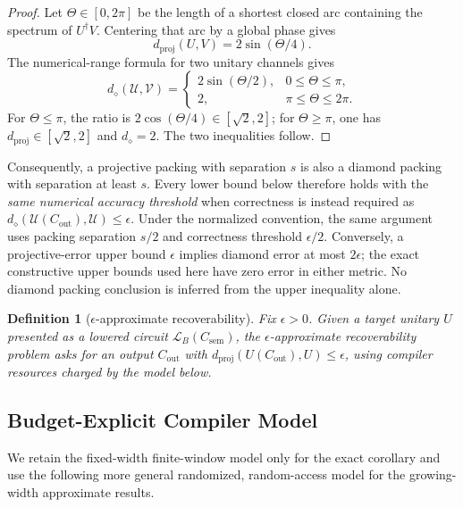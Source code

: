 \documentclass[aps,prx,reprint,floatfix,superscriptaddress]{revtex4-2}
\newtheorem{definition}{Definition}
\begin{document}
\begin{proof}
Let $\Theta\in[0,2\pi]$ be the length of a shortest closed arc containing
the spectrum of $U^\dagger V$.  Centering that arc by a global phase gives
\begin{equation*}
 d_{\mathrm{proj}}(U,V)=2\sin(\Theta/4).
\end{equation*}
The numerical-range formula for two unitary channels gives
\begin{equation*}
 d_\diamond(\mathcal U,\mathcal V)=
 \begin{cases}
  2\sin(\Theta/2),&0\leq\Theta\leq\pi,\\
  2,&\pi\leq\Theta\leq2\pi.
 \end{cases}
\end{equation*}
For $\Theta\leq\pi$, the ratio is $2\cos(\Theta/4)\in[\sqrt2,2]$;
for $\Theta\geq\pi$, one has
$d_{\mathrm{proj}}\in[\sqrt2,2]$ and $d_\diamond=2$.  The two inequalities
follow.
\end{proof}

Consequently, a projective packing with separation $s$ is also a diamond
packing with separation at least $s$.  Every lower bound below therefore
holds with the \emph{same numerical accuracy threshold} when correctness is
instead required as
$d_\diamond(\mathcal U(C_{\mathrm{out}}),\mathcal U)\leq\epsilon$.
Under the normalized convention, the same argument uses packing separation
$s/2$ and correctness threshold $\epsilon/2$.
Conversely, a projective-error upper bound $\epsilon$ implies diamond error
at most $2\epsilon$; the exact constructive upper bounds used here have zero
error in either metric.  No diamond packing conclusion is inferred from the
upper inequality alone.

\begin{definition}[$\epsilon$-approximate recoverability]
\label{def:approx-recoverability}
Fix $\epsilon > 0$. Given a target unitary $U$ presented as a lowered
circuit $\mathcal{L}_B(C_{\mathrm{sem}})$, the $\epsilon$-approximate
recoverability problem asks for an output $C_{\mathrm{out}}$ with
$d_{\mathrm{proj}}(U(C_{\mathrm{out}}), U) \leq \epsilon$, using compiler
resources charged by the model below.
\end{definition}

\subsection{Budget-Explicit Compiler Model}

We retain the fixed-width finite-window model only for the exact corollary
and use the following more general randomized, random-access model for the
growing-width approximate results.
\end{document}
